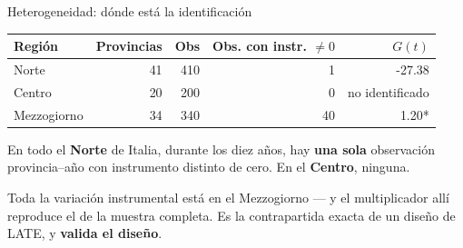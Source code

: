 \documentclass[
  10pt,
  ignorenonframetext,
  aspectratio=169,
  spanish,
]{beamer}
\begin{document}
\begin{frame}{Heterogeneidad: dónde está la identificación}
\protect{}\label{heterogeneidad-duxf3nde-estuxe1-la-identificaciuxf3n}
\begin{table}[!h]
\centering\begingroup\fontsize{9}{11}\selectfont

\begin{tabular}[t]{lrrrr}
\toprule
Región & Provincias & Obs & Obs. con instr. $\neq 0$ & $G(t)$\\
\midrule
Norte & 41 & 410 & 1 & -27.38\\
Centro & 20 & 200 & 0 & no identificado\\
Mezzogiorno & 34 & 340 & 40 & 1.20*\\
\bottomrule
\end{tabular}
\endgroup{}
\end{table}

\vspace{0.35cm}

\begin{alertblock}{}
En todo el \textbf{Norte} de Italia, durante los diez años, hay \textbf{una sola} observación provincia--año con instrumento distinto de cero. En el \textbf{Centro}, ninguna.

\vspace{0.15cm}

Toda la variación instrumental está en el Mezzogiorno --- y el multiplicador allí reproduce el de la muestra completa. Es la contrapartida exacta de un diseño de LATE, y \textbf{valida el diseño}.
\end{alertblock}
\end{frame}
\end{document}
